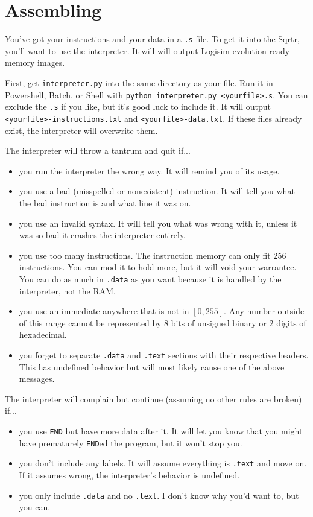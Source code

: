 \documentclass[12pt, oneside]{memoir}
\newcommand{\instruction}[1]{{\color{instruction}\texttt{#1}}}
\newcommand{\header}[1]{{\color{header}\texttt{#1}}}
\begin{document}
\chapter{Assembling}
You've got your instructions and your data in a \texttt{.s} file. To get it into the Sqrtr, you'll want to use the interpreter. It will will output Logisim-evolution-ready memory images. 

First, get \texttt{interpreter.py} into the same directory as your file. Run it in Powershell, Batch, or Shell with \texttt{python interpreter.py <yourfile>.s}. You can exclude the \texttt{.s} if you like, but it's good luck to include it. It will output \texttt{<yourfile>-instructions.txt} and \texttt{<yourfile>-data.txt}. If these files already exist, the interpreter will overwrite them.

The interpreter will throw a tantrum and quit if...
\begin{itemize}
    \item you run the interpreter the wrong way. It will remind you of its usage.
    \item you use a bad (misspelled or nonexistent) instruction. It will tell you what the bad instruction is and what line it was on.
    \item you use an invalid syntax. It will tell you what was wrong with it, unless it was so bad it crashes the interpreter entirely.
    \item you use too many instructions. The instruction memory can only fit 256 instructions. You can mod it to hold more, but it will void your warrantee. You can do as much in \header{.data} as you want because it is handled by the interpreter, not the RAM.
    \item you use an immediate anywhere that is not in $[0,255]$. Any number outside of this range cannot be represented by 8 bits of unsigned binary or 2 digits of hexadecimal.
    \item you forget to separate \header{.data} and \header{.text} sections with their respective headers. This has undefined behavior but will most likely cause one of the above messages.
\end{itemize}

The interpreter will complain but continue (assuming no other rules are broken) if...
\begin{itemize}
    \item you use \instruction{END} but have more data after it. It will let you know that you might have prematurely \instruction{END}ed the program, but it won't stop you.
    \item you don't include any labels. It will assume everything is \header{.text} and move on. If it assumes wrong, the interpreter's behavior is undefined.
    \item you only include \header{.data} and no \header{.text}. I don't know why you'd want to, but you can.
\end{itemize}
\end{document}
